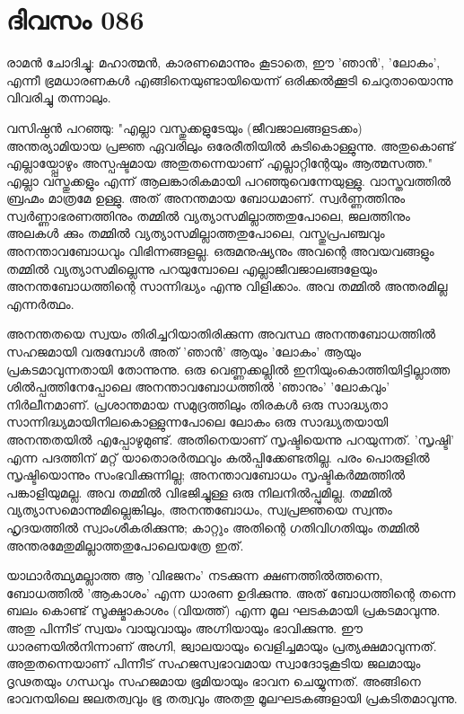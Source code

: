 \newpage
\section{ദിവസം 086}


രാമന്‍ ചോദിച്ചു: മഹാത്മന്‍, കാരണമൊന്നും കൂടാതെ, ഈ 'ഞാന്‍', 'ലോകം', എന്നീ ഭ്രമധാരണകള്‍ എങ്ങിനെയുണ്ടായിയെന്ന് ഒരിക്കല്‍ക്കൂടി ചെറുതായൊന്നു വിവരിച്ചു തന്നാലും.

വസിഷ്ഠന്‍ പറഞ്ഞു: "എല്ലാ വസ്തുക്കളുടേയും (ജീവജാലങ്ങളടക്കം) അന്തര്യാമിയായ പ്രജ്ഞ ഏവരിലും ഒരേരീതിയില്‍ കുടികൊള്ളുന്നു. അതുകൊണ്ട്‌ എല്ലായ്പ്പോഴും അസ്പഷ്ടമായ അതുതന്നെയാണ്‌ എല്ലാറ്റിന്റേയും ആത്മസത്ത." എല്ലാ വസ്തുക്കളും എന്ന് ആലങ്കാരികമായി പറഞ്ഞുവെന്നേയുള്ളു. വാസ്തവത്തില്‍ ബ്രഹ്മം മാത്രമേ ഉള്ളു. അത്‌ അനന്തമായ ബോധമാണ്‌. സ്വര്‍ണ്ണത്തിനും സ്വര്‍ണ്ണാഭരണത്തിനും തമ്മില്‍ വ്യത്യാസമില്ലാത്തതുപോലെ, ജലത്തിനും അലകള്‍ ക്കും തമ്മില്‍ വ്യത്യാസമില്ലാത്തതുപോലെ, വസ്തുപ്രപഞ്ചവും അനന്താവബോധവും വിഭിന്നങ്ങളല്ല. ഒരുമനുഷ്യനും അവന്റെ അവയവങ്ങളും തമ്മില്‍ വ്യത്യാസമില്ലെന്നു പറയുമ്പോലെ എല്ലാജീവജാലങ്ങളേയും അനന്തബോധത്തിന്റെ സാന്നിദ്ധ്യം എന്നു വിളിക്കാം. അവ തമ്മില്‍ അന്തരമില്ല എന്നര്‍ത്ഥം. 

അനന്തതയെ സ്വയം തിരിച്ചറിയാതിരിക്കുന്ന അവസ്ഥ അനന്തബോധത്തില്‍ സഹജമായി വരുമ്പോള്‍ അത്‌ 'ഞാന്‍' ആയും 'ലോകം' ആയും പ്രകടമാവുന്നതായി തോന്നുന്നു. ഒരു വെണ്ണക്കല്ലില്‍ ഇനിയുംകൊത്തിയിട്ടില്ലാത്ത ശില്‍പ്പത്തിനേപ്പോലെ അനന്താവബോധത്തില്‍ 'ഞാനും' 'ലോകവും' നിര്‍ലീനമാണ്‌. പ്രശാന്തമായ സമുദ്രത്തിലും തിരകള്‍ ഒരു സാദ്ധ്യതാ സാന്നിദ്ധ്യമായിനിലകൊള്ളുന്നപോലെ ലോകം ഒരു സാദ്ധ്യതയായി അനന്തതയില്‍ എപ്പോഴുമുണ്ട്‌. അതിനെയാണ്‌ സൃഷ്ടിയെന്നു പറയുന്നത്‌. 'സൃഷ്ടി' എന്ന പദത്തിന്‌ മറ്റ്‌ യാതൊരര്‍ത്ഥവും കല്‍പ്പിക്കേണ്ടതില്ല. പരം പൊരുളില്‍ സൃഷ്ടിയൊന്നും സംഭവിക്കുന്നില്ല; അനന്താവബോധം സൃഷ്ടികര്‍മ്മത്തില്‍ പങ്കാളിയുമല്ല. അവ തമ്മില്‍ വിഭജിച്ചുള്ള ഒരു നിലനില്‍പ്പുമില്ല. തമ്മില്‍ വ്യത്യാസമൊന്നുമില്ലെങ്കിലും, അനന്തബോധം, സ്വപ്രജ്ഞയെ സ്വന്തം ഹൃദയത്തില്‍ സ്വാംശീകരിക്കുന്നു; കാറ്റും അതിന്റെ ഗതിവിഗതിയും തമ്മില്‍ അന്തരമേതുമില്ലാത്തതുപോലെയത്രേ ഇത്‌. 

യാഥാര്‍ത്ഥ്യമല്ലാത്ത ആ 'വിഭജനം' നടക്കുന്ന ക്ഷണത്തില്‍ത്തന്നെ, ബോധത്തില്‍ 'ആകാശം' എന്ന ധാരണ ഉദിക്കുന്നു. അത്‌ ബോധത്തിന്റെ തന്നെ ബലം കൊണ്ട്‌ സൂക്ഷ്മാകാശം (വിയത്ത്‌) എന്ന മൂല ഘടകമായി പ്രകടമാവുന്നു. അതു പിന്നീട്‌ സ്വയം വായുവായും അഗ്നിയായും ഭാവിക്കുന്നു. ഈ ധാരണയില്‍നിന്നാണ്‌ അഗ്നി, ജ്വാലയായും വെളിച്ചമായും പ്രത്യക്ഷമാവുന്നത്‌. അതുതന്നെയാണ്‌ പിന്നീട്‌ സഹജസ്വഭാവമായ സ്വാദോടുകൂടിയ ജലമായും ദൃഢതയും ഗന്ധവും സഹജമായ ഭൂമിയായും ഭാവന ചെയ്യുന്നത്‌. അങ്ങിനെ ഭാവനയിലെ ജലതത്വവും ഭൂ തത്വവും അതതു മൂലഘടകങ്ങളായി പ്രകടിതമാവുന്നു.

